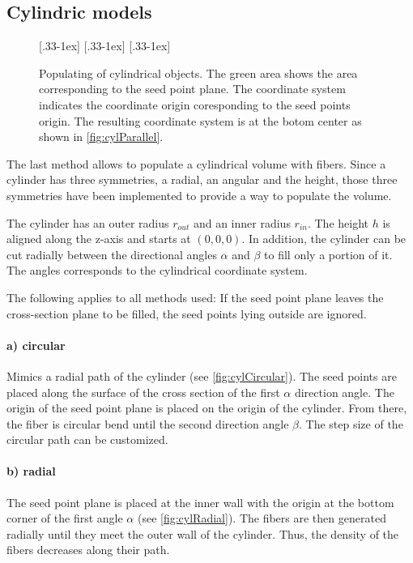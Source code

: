 \subsection{Cylindric models}
%
\begin{figure}[!t]
    \centering
    \setlength{\tikzwidth}{0.31\textwidth}
    [.33\textwidth-1ex]{
    }\hfill
    [.33\textwidth-1ex]{
    }\hfill
    [.33\textwidth-1ex]{
    }
	\caption{Populating of cylindrical objects. The green area shows the area corresponding to the seed point plane. The coordinate system indicates the coordinate origin coresponding to the seed points origin. The resulting coordinate system is at the botom center as shown in \cref{fig:cylParallel}.}
\end{figure}
%
The last method allows to populate a cylindrical volume with fibers.
Since a cylinder has three symmetries, a radial, an angular and the height, those three symmetries have been implemented to provide a way to populate the volume.
\par
%
The cylinder has an outer radius $r_{\mathit{out}}$ and an inner radius $r_{\mathit{in}}$.
The height $h$ is aligned along the z-axis and starts at $(0,0,0)$.
In addition, the cylinder can be cut radially between the directional angles $\alpha$ and $\beta$ to fill only a portion of it.
The angles corresponds to the cylindrical coordinate system.
\par
%
The following applies to all methods used: If the seed point plane leaves the cross-section plane to be filled, the seed points lying outside are ignored.
%
\paragraph{a) circular}
Mimics a radial path of the cylinder (see \cref{fig:cylCircular}).
The seed points are placed along the surface of the cross section of the first $\alpha$ direction angle.
The origin of the seed point plane is placed on the origin of the cylinder.
From there, the fiber is circular bend until the second direction angle $\beta$.
The step size of the circular path can be customized.
%
\paragraph{b) radial}
The seed point plane is placed at the inner wall with the origin at the bottom corner of the first angle $\alpha$ (see \cref{fig:cylRadial}).
The fibers are then generated radially until they meet the outer wall of the cylinder.
Thus, the density of the fibers decreases along their path.
%
